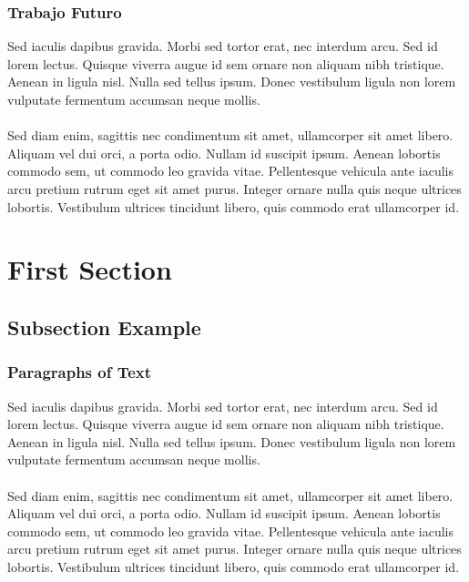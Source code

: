 \documentclass{beamer}
\begin{document}
\begin{frame}
\frametitle{Trabajo Futuro}
Sed iaculis dapibus gravida. Morbi sed tortor erat, nec interdum arcu. Sed id lorem lectus. Quisque viverra augue id sem ornare non aliquam nibh tristique. Aenean in ligula nisl. Nulla sed tellus ipsum. Donec vestibulum ligula non lorem vulputate fermentum accumsan neque mollis.\\~\\

Sed diam enim, sagittis nec condimentum sit amet, ullamcorper sit amet libero. Aliquam vel dui orci, a porta odio. Nullam id suscipit ipsum. Aenean lobortis commodo sem, ut commodo leo gravida vitae. Pellentesque vehicula ante iaculis arcu pretium rutrum eget sit amet purus. Integer ornare nulla quis neque ultrices lobortis. Vestibulum ultrices tincidunt libero, quis commodo erat ullamcorper id.
\end{frame}

\section{First Section} %

\subsection{Subsection Example} %

\begin{frame}
\frametitle{Paragraphs of Text}
Sed iaculis dapibus gravida. Morbi sed tortor erat, nec interdum arcu. Sed id lorem lectus. Quisque viverra augue id sem ornare non aliquam nibh tristique. Aenean in ligula nisl. Nulla sed tellus ipsum. Donec vestibulum ligula non lorem vulputate fermentum accumsan neque mollis.\\~\\

Sed diam enim, sagittis nec condimentum sit amet, ullamcorper sit amet libero. Aliquam vel dui orci, a porta odio. Nullam id suscipit ipsum. Aenean lobortis commodo sem, ut commodo leo gravida vitae. Pellentesque vehicula ante iaculis arcu pretium rutrum eget sit amet purus. Integer ornare nulla quis neque ultrices lobortis. Vestibulum ultrices tincidunt libero, quis commodo erat ullamcorper id.
\end{frame}
\end{document}
